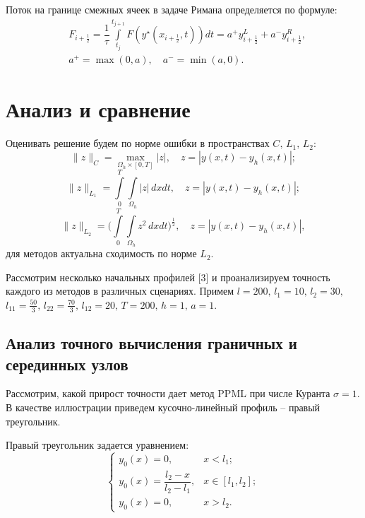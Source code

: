 \documentclass[12pt,a4paper]{article}
\newcommand{\half}{\frac{1}{2}}
\begin{document}
    Поток на границе смежных ячеек в задаче Римана определяется по формуле:
    \begin{equation}
        \label{boundary_flow}
        \begin{split}
            &F_{i+\half} = \dfrac{1}{\tau} \displaystyle \int\limits_{t_j}^{t_{j+1}} F(y^\star(x_{i+\half}, t))dt = a^+ y_{i+\half}^L + a^- y_{i+\half}^R, \\[0.5em]
            &a^+ = \max(0, a), \quad a^- = \min(a, 0).
        \end{split}
    \end{equation}

    \section{Анализ и сравнение}

    Оценивать решение будем по норме ошибки в пространствах $ C,\, L_1,\, L_2\colon $
    \[
        \|z\|_{C} = \max_{\Omega_h \times [0, T]} |z|, \quad z = |y(x,t)-y_h(x,t)|;
    \]
    \[
        \|z\|_{L_1} = \int\limits_{0}^{T}\int\limits_{\Omega_h} |z|\, dx dt, \quad z = |y(x,t)-y_h(x,t)|;
    \]
    \[
        \|z\|_{L_2} = \Biggl( \int\limits_{0}^{T}\int\limits_{\Omega_h} z^2\, dx dt \Biggr)^{\tfrac{1}{2}}, \quad z = |y(x,t)-y_h(x,t)|,
    \]
    \noindent для методов актуальна сходимость по норме $ L_2 $.

    Рассмотрим несколько начальных профилей [3] и проанализируем точность каждого из методов в различных сценариях. Примем $ l = 200,\, l_1 = 10,\, l_2 = 30,$
    \noindent $ l_{11} = \frac{50}{3},\, l_{22} = \frac{70}{3},\, l_{12} = 20,\, T = 200,\, h = 1,\, a = 1$.

    \subsection{Анализ точного вычисления граничных и серединных узлов}

    Рассмотрим, какой прирост точности дает метод PPML при числе Куранта $ \sigma = 1 $. В качестве иллюстрации приведем кусочно-линейный профиль -- правый треугольник.

    Правый треугольник задается уравнением:
    \[
        \begin{cases}
            y_0(x) = 0, & x < l_1; \\
            y_0(x) = \dfrac{l_2 - x}{l_2 - l_1}, & x \in [l_1, l_2]; \\ 
            y_0(x) = 0, & x > l_2.
        \end{cases}
    \]
\end{document}
